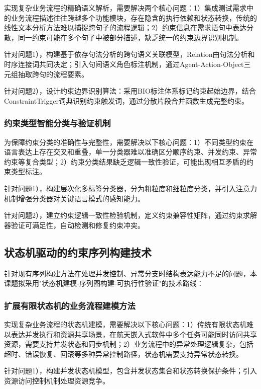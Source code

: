 \documentclass[fontset=windows]{article}
\begin{document}
实现复杂业务流程的精确语义解析，需要解决两个核心问题：1）集成测试需求中的业务流程描述往往跨越多个功能模块，存在隐含的执行依赖和状态转换，传统的线性文本分析方法难以捕捉跨句子的流程逻辑；2）约束信息在需求语句中表达分散，同一约束可能在多个句子中被部分描述，缺乏统一的约束边界识别机制。

针对问题1），构建基于依存句法分析的跨句语义关联模型，Relation由句法分析和时序连接词共同决定；引入句间语义角色标注机制，通过Agent-Action-Object三元组抽取跨句的流程要素。

针对问题2），设计约束边界识别算法：采用BIO标注体系标记约束起始边界，结合ConstraintTrigger词典识别约束触发词，通过分散片段合并函数生成完整约束。

\subsubsection{约束类型智能分类与验证机制}

为保障约束分类的准确性与完整性，需要解决以下核心问题：1）不同类型约束在语言表达上存在交叉和重叠，单一分类器难以准确区分顺序约束、并发约束、异常约束等复合类型；2）约束分类结果缺乏逻辑一致性验证，可能出现相互矛盾的约束类型标注。

针对问题1），构建层次化多标签分类器，分为粗粒度和细粒度分类，并引入注意力机制增强分类器对关键语言模式的感知能力。

针对问题2），建立约束逻辑一致性检验机制，定义约束兼容性矩阵，通过约束求解器验证可满足性，自动检测和修复约束冲突。

\subsection{状态机驱动的约束序列构建技术}

针对现有序列构建方法在处理并发控制、异常分支时结构表达能力不足的问题，本课题拟采用"状态机建模-序列图构建-可执行性验证"的技术路线：

\subsubsection{扩展有限状态机的业务流程建模方法}

实现复杂业务流程的状态机建模，需要解决以下核心问题：1）传统有限状态机难以表达并发执行和资源共享场景，在航天嵌入式软件中多个任务可能同时访问共享资源，需要支持并发状态和同步机制；2）业务流程中的异常处理逻辑复杂，包括超时、错误恢复、回滚等多种异常控制路径，状态机需要支持异常状态转换。

针对问题1），构建并发状态机模型，包含并发状态集合和状态转换保护条件；引入资源访问控制机制处理资源竞争。
\end{document}
